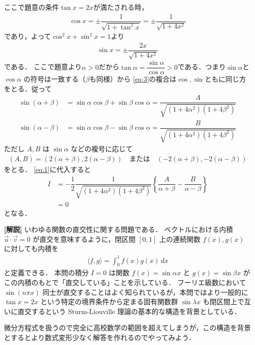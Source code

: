 \documentclass[../../main.tex]{subfiles}
\begin{document}
ここで題意の条件$\tan x = 2x$が満たされる時，
\begin{align}
  \cos x = \pm \dfrac{1}{\sqrt{1+\tan^2 x}} = \pm \dfrac{1}{\sqrt{1+4x^2}} \label{eq:2}
\end{align}
であり，よって$\cos^2 x+\sin^2 x=1$より
\begin{align}
  \sin x = \pm \dfrac{2x}{\sqrt{1+4x^2}} \label{eq:3}
\end{align}
である．
ここで題意より$\alpha > 0$だから$\tan\alpha = \dfrac{\sin \alpha}{\cos \alpha} > 0$である．つまり$\sin\alpha$と $\cos \alpha$ の符号は一致する（$\beta$も同様）から
\cref{eq:3}の複合は$\cos, \sin$ともに同じ方をとる．従って
\begin{align}
  \sin(\alpha+\beta) &= \sin\alpha\cos\beta + \sin\beta\cos\alpha = \dfrac{A}{\sqrt{(1+4\alpha^2)(1+4\beta^2)}} \\
  \sin(\alpha-\beta) &= \sin\alpha\cos\beta - \sin\beta\cos\alpha = \dfrac{B}{\sqrt{(1+4\alpha^2)(1+4\beta^2)}}
\end{align}
ただし $A, B$ は $\sin\alpha$ などの複号に応じて
\begin{align}
  (A, B) = \left(2(\alpha+\beta), 2(\alpha-\beta)\right) \quad \text{または} \quad \left(-2(\alpha+\beta), -2(\alpha-\beta)\right)
\end{align}
をとる．
\cref{eq:1}に代入すると
\begin{align}
  I
  &= -\dfrac{1}{2} \dfrac{1}{\sqrt{(1+4\alpha^2)(1+4\beta^2)}} \left\{ \dfrac{A}{\alpha+\beta} - \dfrac{B}{\alpha-\beta} \right\} \\
  &= 0
\end{align}
となる．

{\bf [解説]}
いわゆる関数の直交性に関する問題である．
ベクトルにおける内積 $\vec{u} \cdot \vec{v} = 0$ が直交を意味するように，閉区間 $[0, 1]$ 上の連続関数 $f(x), g(x)$ に対しても内積を
\begin{align}
  \langle f, g \rangle = \int_0^1 f(x)g(x) \, dx
\end{align}
と定義できる．
本問の積分 $I = 0$ は関数 $f(x) = \sin\alpha x$ と $g(x) = \sin\beta x$ がこの内積のもとで「直交している」ことを示している．
フーリエ級数において $\sin(n\pi x)$ 同士が直交することはよく知られているが，本問ではより一般的に $\tan x = 2x$ という特定の境界条件から定まる固有関数群 $\sin\lambda x$ も閉区間上で互いに直交するという Sturm-Liouville 理論の基本的な構造を背景としている．

微分方程式を扱うので完全に高校数学の範囲を超えてしまうが，この構造を背景とするとより数式変形少なく解答を作れるのでやってみよう．
\end{document}
